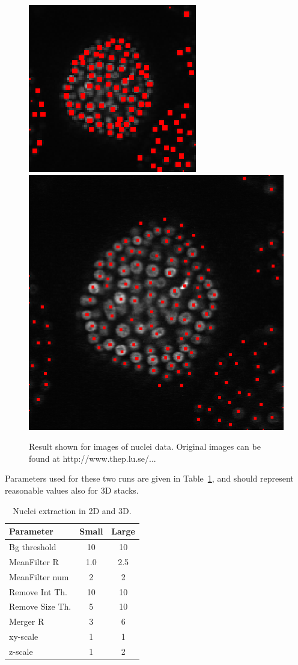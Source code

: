 \documentclass[a4paper,12pt]{article}
\begin{document}
\begin{figure}[h!]
\begin{center}
\includegraphics[width=0.25\columnwidth]{figures/43smallzoomCenters.eps}
\hspace{0.20\columnwidth}
\includegraphics[width=0.5\columnwidth]{figures/43zoomCenters.eps}
\caption{Result shown for images of nuclei data. Original images can be found
	at http://www.thep.lu.se/...}
\label{fig:43zoom}
\end{center}
\end{figure}
%
Parameters used for these two runs are given in Table~\ref{tab:43zoom}, and
should represent reasonable values also for 3D stacks.

\begin{table}
	\begin{center}
		\begin{tabular}{|l|cc|}
			\hline
			Parameter & Small & Large\\
			\hline
			Bg threshold & 10 & 10\\
			MeanFilter R & 1.0 & 2.5\\
			MeanFilter num & 2 & 2\\
			Remove Int Th. & 10 & 10\\
			Remove Size Th. & 5 & 10\\
			Merger R & 3 & 6\\
			xy-scale & 1 & 1\\
			z-scale & 1 & 2\\
			\hline
		\end{tabular}
		\caption{Nuclei extraction in 2D and 3D.}
		\label{tab:43zoom}
	\end{center}
\end{table}
\end{document}
